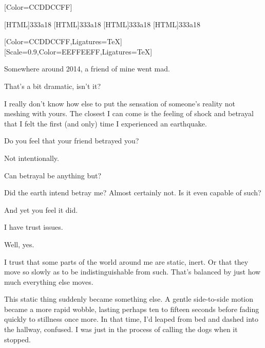 \renewfontfamily{}[Color=CCDDCCFF]

[HTML]{333a18}
[HTML]{333a18}
[HTML]{333a18}
[HTML]{333a18}

\begin{paracol}{2}
\begin{leftcolumn}
  [Color=CCDDCCFF,Ligatures=TeX]
  \renewfontfamily{}[Scale=0.9,Color=EEFFEEFF,Ligatures=TeX]

\noindent Somewhere around 2014, a friend of mine went mad.

\begin{ally}
That's a bit dramatic, isn't it?
\end{ally}
I really don't know how else to put the sensation of someone's reality not meshing with yours. The closest I can come is the feeling of shock and betrayal that I felt the first (and only) time I experienced an earthquake.

\begin{ally}
Do you feel that your friend betrayed you?
\end{ally}
Not intentionally.

\begin{ally}
Can betrayal be anything but?
\end{ally}
Did the earth intend betray me? Almost certainly not. Is it even capable of such?

\begin{ally}
And yet you feel it did.
\end{ally}
I have trust issues.

\begin{ally}
Well, yes.
\end{ally}
I trust that some parts of the world around me are static, inert. Or that they move so slowly as to be indistinguishable from such. That's balanced by just how much everything else moves.

This static thing suddenly became something else. A gentle side-to-side motion became a more rapid wobble, lasting perhaps ten to fifteen seconds before fading quickly to stillness once more. In that time, I'd leaped from bed and dashed into the hallway, confused. I was just in the process of calling the dogs when it stopped.


\end{leftcolumn}
\end{paracol}
